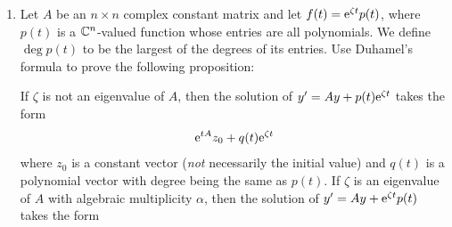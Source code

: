 \documentclass[../psets.tex]{subfiles}
\begin{document}
\begin{enumerate}
\begin{proof}
\begin{align*}
\begin{split}
\begin{pmatrix}
                    \e[i(t-\tau)] & 0\\
                    0 & \e[-i(t-\tau)]\\
                \end{pmatrix}
                \begin{pmatrix}
                    -i/2 & 1/2\\
                    i/2 & 1/2\\
                \end{pmatrix}
                \begin{pmatrix}
                    -\tau\\
                    \tau\\
                \end{pmatrix}
                \dd\tau
            \end{split}\\
            ={}&
            \begin{pmatrix}
                \frac{\e[it]+\e[-it]}{2}\\
                \frac{\e[it]-\e[-it]}{2i}\\
            \end{pmatrix}
            +\int_0^t
            \begin{pmatrix}
                \tau\left( \frac{\e[i(t-\tau)]-\e[-i(t-\tau)]}{2i}-\frac{\e[i(t-\tau)]+\e[-i(t-\tau)]}{2} \right)\\
                \tau\left( \frac{\e[i(t-\tau)]-\e[-i(t-\tau)]}{2i}-\frac{\e[i(t-\tau)]+\e[-i(t-\tau)]}{2} \right)\\
            \end{pmatrix}
        \end{align*}
        Substitute sines and cosines and evaluate.
    \end{proof}
    \item Let $A$ be an $n\times n$ complex constant matrix and let $f(t)=\e[\zeta t]p(t)$, where $p(t)$ is a $\C^n$-valued function whose entries are all polynomials. We define $\deg p(t)$ to be the largest of the degrees of its entries. Use Duhamel's formula to prove the following proposition:\par
    If $\zeta$ is not an eigenvalue of $A$, then the solution of $y'=Ay+p(t)\e[\zeta t]$ takes the form
    \begin{equation*}
        \e[tA]z_0+q(t)\e[\zeta t]
    \end{equation*}
    where $z_0$ is a constant vector (\emph{not} necessarily the initial value) and $q(t)$ is a polynomial vector with degree being the same as $p(t)$. If $\zeta$ is an eigenvalue of $A$ with algebraic multiplicity $\alpha$, then the solution of $y'=Ay+\e[\zeta t]p(t)$ takes the form

\end{enumerate}
\end{document}
